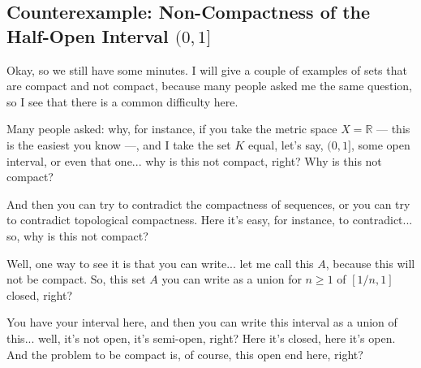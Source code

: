 \begin{hidden}
\end{hidden}

\subsection{Counterexample: Non-Compactness of the Half-Open Interval \texorpdfstring{$(0, 1]$}{(0, 1]}}

\begin{speech}[01:07:31 - 01:09:14]
Okay, so we still have some minutes. I will give a couple of examples of sets that are compact and not compact, because many people asked me the same question, so I see that there is a common difficulty here.

Many people asked: why, for instance, if you take the metric space $X = \mathbb{R}$ --- this is the easiest you know ---, and I take the set $K$ equal, let's say, $(0, 1]$, some open interval, or even that one... \inlinemetanote{writes '$X = \mathbb{R}$' and '$K = (0, 1]$'} why is this not compact, right?  Why is this not compact?

And then you can try to contradict the compactness of sequences, or you can try to contradict topological compactness. Here it's easy, for instance, to contradict... so, why is this not compact?

Well, one way to see it is that you can write... let me call this $A$, because this will not be compact.  So, this set $A$ you can write as a union for $n \ge 1$  of $[1/n, 1]$ closed, right?

You have your interval here, \inlinemetanote{draws '(  ]' on the board with $0$ and $1$} and then you can write this interval as a union of this... well, it's not open, it's semi-open, right? Here it's closed, here it's open. And the problem to be compact is, of course, this open end here, right?
\end{speech}

